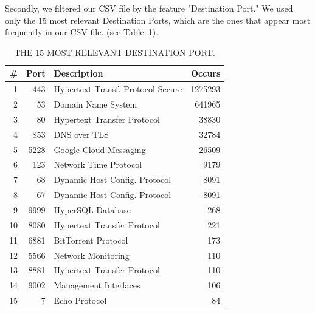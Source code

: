 Secondly, we filtered our CSV file by the feature "Destination Port." We used only the 15 most relevant Destination Ports, which are the ones that appear most frequently in our CSV file. (see Table~\ref{tab:port}).

\begin{table}[h]
  \caption{THE 15 MOST RELEVANT DESTINATION PORT.}
  \centering
  \begin{small}
    \begin{tabular}{rrlr}   \hline
 \# & Port & Description & Occurs  \\ \hline

1 &  443 &  Hypertext Transf. Protocol Secure &  1275293  \\ 
  2 &  53 & Domain Name System & 641965  \\ 
  3 &  80 & Hypertext Transfer Protocol &  38830  \\ 
  4 &  853 & DNS over TLS &  32784  \\ 
  5 &  5228 & Google Cloud Messaging &  26509  \\ 
  6 &  123 & Network Time Protocol & 9179  \\ 
  7 &  68 & Dynamic Host Config. Protocol &  8091  \\ 
  8 &  67 & Dynamic Host Config. Protocol &  8091  \\ 
  9 &  9999 & HyperSQL Database &  268  \\ 
  10 & 8080 & Hypertext Transfer Protocol & 221  \\ 
  11 & 6881 & BitTorrent Protocol & 173  \\ 
  12 & 5566 & Network Monitoring & 110  \\ 
  13 & 8881 & Hypertext Transfer Protocol & 110  \\ 
  14 & 9002 & Management Interfaces & 106  \\ 
  15 & 7 & Echo Protocol & 84  \\ 
   \hline

 \end{tabular}
 \end{small}
 \label{tab:port}
 \end{table}


